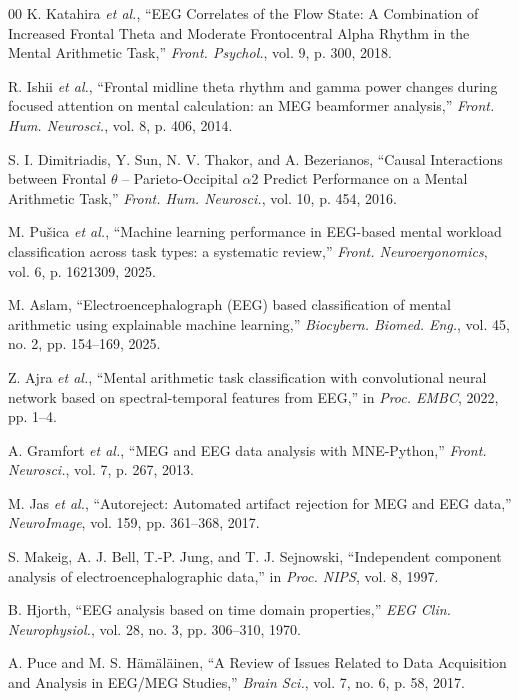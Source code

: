 \documentclass[conference]{IEEEtran}
\begin{document}
\begin{thebibliography}{00}
K. Katahira \textit{et al.}, ``EEG Correlates of the Flow State: A Combination of Increased Frontal Theta and Moderate Frontocentral Alpha Rhythm in the Mental Arithmetic Task,'' \textit{Front. Psychol.}, vol. 9, p. 300, 2018.

R. Ishii \textit{et al.}, ``Frontal midline theta rhythm and gamma power changes during focused attention on mental calculation: an MEG beamformer analysis,'' \textit{Front. Hum. Neurosci.}, vol. 8, p. 406, 2014.

S. I. Dimitriadis, Y. Sun, N. V. Thakor, and A. Bezerianos, ``Causal Interactions between Frontal $\theta$ -- Parieto-Occipital $\alpha$2 Predict Performance on a Mental Arithmetic Task,'' \textit{Front. Hum. Neurosci.}, vol. 10, p. 454, 2016.

M. Pušica \textit{et al.}, ``Machine learning performance in EEG-based mental workload classification across task types: a systematic review,'' \textit{Front. Neuroergonomics}, vol. 6, p. 1621309, 2025.

M. Aslam, ``Electroencephalograph (EEG) based classification of mental arithmetic using explainable machine learning,'' \textit{Biocybern. Biomed. Eng.}, vol. 45, no. 2, pp. 154--169, 2025.

Z. Ajra \textit{et al.}, ``Mental arithmetic task classification with convolutional neural network based on spectral-temporal features from EEG,'' in \textit{Proc. EMBC}, 2022, pp. 1--4.

A. Gramfort \textit{et al.}, ``MEG and EEG data analysis with MNE-Python,'' \textit{Front. Neurosci.}, vol. 7, p. 267, 2013.

M. Jas \textit{et al.}, ``Autoreject: Automated artifact rejection for MEG and EEG data,'' \textit{NeuroImage}, vol. 159, pp. 361--368, 2017.

S. Makeig, A. J. Bell, T.-P. Jung, and T. J. Sejnowski, ``Independent component analysis of electroencephalographic data,'' in \textit{Proc. NIPS}, vol. 8, 1997.

B. Hjorth, ``EEG analysis based on time domain properties,'' \textit{EEG Clin. Neurophysiol.}, vol. 28, no. 3, pp. 306--310, 1970.

A. Puce and M. S. Hämäläinen, ``A Review of Issues Related to Data Acquisition and Analysis in EEG/MEG Studies,'' \textit{Brain Sci.}, vol. 7, no. 6, p. 58, 2017.


\end{thebibliography}
\end{document}
